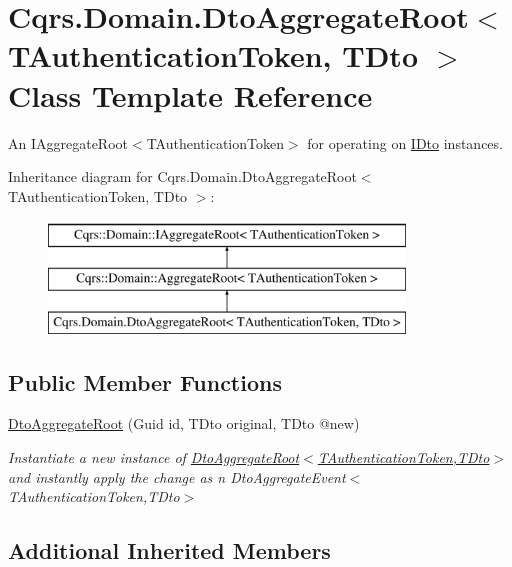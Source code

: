 \hypertarget{classCqrs_1_1Domain_1_1DtoAggregateRoot}{}\section{Cqrs.\+Domain.\+Dto\+Aggregate\+Root$<$ T\+Authentication\+Token, T\+Dto $>$ Class Template Reference}
\label{classCqrs_1_1Domain_1_1DtoAggregateRoot}


An I\+Aggregate\+Root$<$\+T\+Authentication\+Token$>$ for operating on \hyperlink{interfaceCqrs_1_1Domain_1_1IDto}{I\+Dto} instances.  


Inheritance diagram for Cqrs.\+Domain.\+Dto\+Aggregate\+Root$<$ T\+Authentication\+Token, T\+Dto $>$\+:\begin{figure}[H]
\begin{center}
\leavevmode
\includegraphics[height=3.000000cm]{classCqrs_1_1Domain_1_1DtoAggregateRoot}
\end{center}
\end{figure}
\subsection*{Public Member Functions}
\begin{DoxyCompactItemize}
\item 
\hyperlink{classCqrs_1_1Domain_1_1DtoAggregateRoot_aa99d95d5b4b1fb8a59beda77f7e12c20_aa99d95d5b4b1fb8a59beda77f7e12c20}{Dto\+Aggregate\+Root} (Guid id, T\+Dto original, T\+Dto @new)
\begin{DoxyCompactList}\small\item\em Instantiate a new instance of \hyperlink{classCqrs_1_1Domain_1_1DtoAggregateRoot_aa99d95d5b4b1fb8a59beda77f7e12c20_aa99d95d5b4b1fb8a59beda77f7e12c20}{Dto\+Aggregate\+Root$<$\+T\+Authentication\+Token,\+T\+Dto$>$} and instantly apply the change as n Dto\+Aggregate\+Event$<$\+T\+Authentication\+Token,\+T\+Dto$>$ \end{DoxyCompactList}\end{DoxyCompactItemize}
\subsection*{Additional Inherited Members}


